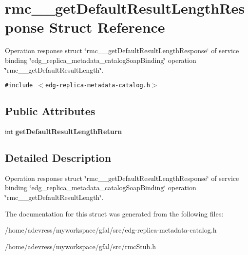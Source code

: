 \section{rmc\_\-\_\-get\-Default\-Result\-Length\-Response Struct Reference}
\label{structrmc____getDefaultResultLengthResponse}
Operation response struct \char`\"{}rmc\_\-\_\-get\-Default\-Result\-Length\-Response\char`\"{} of service binding \char`\"{}edg\_\-replica\_\-metadata\_\-catalog\-Soap\-Binding\char`\"{} operation \char`\"{}rmc\_\-\_\-get\-Default\-Result\-Length\char`\"{}.  


{\tt \#include $<$edg-replica-metadata-catalog.h$>$}

\subsection*{Public Attributes}
\begin{CompactItemize}
\item 
int \textbf{get\-Default\-Result\-Length\-Return}\label{structrmc____getDefaultResultLengthResponse_5d71fd662c818763cb2b8f398f8e8ee7}

\end{CompactItemize}


\subsection{Detailed Description}
Operation response struct \char`\"{}rmc\_\-\_\-get\-Default\-Result\-Length\-Response\char`\"{} of service binding \char`\"{}edg\_\-replica\_\-metadata\_\-catalog\-Soap\-Binding\char`\"{} operation \char`\"{}rmc\_\-\_\-get\-Default\-Result\-Length\char`\"{}. 



The documentation for this struct was generated from the following files:\begin{CompactItemize}
\item 
/home/adevress/myworkspace/gfal/src/edg-replica-metadata-catalog.h\item 
/home/adevress/myworkspace/gfal/src/rmc\-Stub.h\end{CompactItemize}
